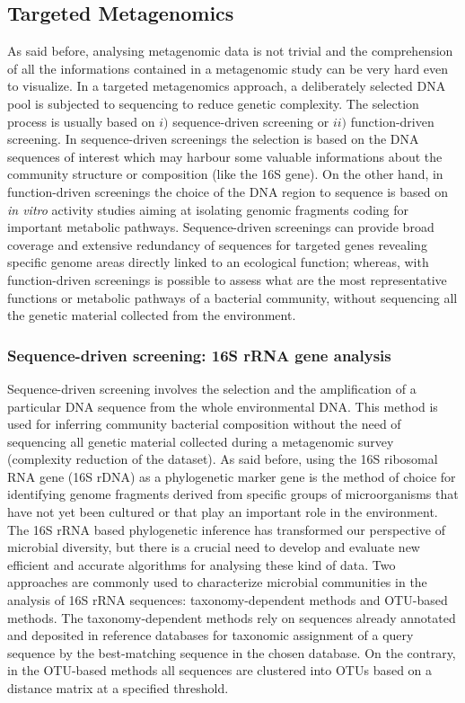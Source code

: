 \subsection{Targeted Metagenomics}
As said before, analysing metagenomic data is not trivial and the comprehension of all the informations contained in a metagenomic study can be very hard even to visualize. In a targeted metagenomics approach, a deliberately selected DNA pool is subjected to sequencing to reduce genetic complexity. The selection process is usually based on $i)$ sequence-driven screening or $ii)$ function-driven screening.
In sequence-driven screenings the selection is based on the DNA sequences of interest which may harbour some valuable informations about the community structure or composition (like the 16S gene). On the other hand, in function-driven screenings the choice of the DNA region to sequence is based on \textit{in vitro} activity studies aiming at isolating genomic fragments coding for important metabolic pathways. Sequence-driven screenings can provide broad coverage and extensive redundancy of sequences for targeted genes revealing specific genome areas directly linked to an ecological function; whereas, with function-driven screenings is possible to assess what are the most representative functions or metabolic pathways of a bacterial community, without sequencing all the genetic material collected from the environment.\\

\subsubsection{Sequence-driven screening: 16S rRNA gene analysis}
Sequence-driven screening involves the selection and the amplification of a particular DNA sequence from the whole environmental DNA. This method is used for inferring community bacterial composition without the need of sequencing all genetic material collected during a metagenomic survey (complexity reduction of the dataset). As said before, using the 16S ribosomal RNA gene (16S rDNA) as a phylogenetic marker gene is the method of choice for identifying genome fragments derived from specific groups of microorganisms that have not yet been cultured or that play an important role in the environment. The 16S rRNA based phylogenetic inference has transformed our perspective of microbial diversity, but there is a crucial need to develop and evaluate new efficient and accurate algorithms for analysing these kind of data. Two approaches are commonly used to characterize microbial communities in the analysis of 16S rRNA sequences: taxonomy-dependent methods and OTU-based methods. The taxonomy-dependent methods rely on sequences already annotated and deposited in reference databases for taxonomic assignment of a query sequence by the best-matching sequence in the chosen database. On the contrary, in the OTU-based methods all sequences are clustered into OTUs based on a distance matrix at a specified threshold.\\

